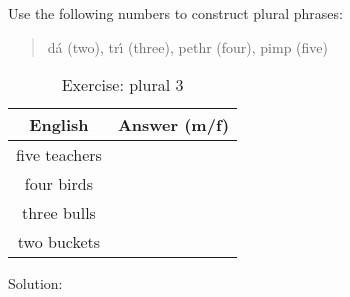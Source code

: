 Use the following numbers to construct plural phrases:\\
\begin{quote}
d\'{a} (two), tr\'{\i} (three), pethr (four), pimp (five)
\end{quote}

\begin{table}[H]
\centering
\begin{tabu}{|c|M{10.0cm}|}
  \toprule
  \textbf{English} & \textbf{Answer (m/f)}\\
  \toprule
  five teachers & \\
  \midrule
  four birds & \\
  \midrule
  three bulls & \\
  \midrule
  two buckets & \\
  \bottomrule
\end{tabu}
\label{exercise_plural_3}
\caption{Exercise: plural 3}
\end{table}

\newpage
Solution:
\begin{table}[H]
\centering
\label{solution_plural_3}
\caption{Solution: plural 3}
\end{table}
